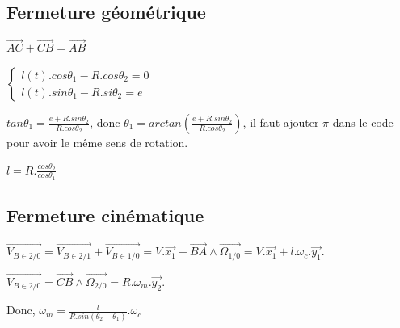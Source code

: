 \subsection{Fermeture géométrique}

$\overrightarrow{AC}+\overrightarrow{CB}=\overrightarrow{AB}$

$\left\{\begin{array}{l}
l(t).cos\theta_1-R.cos\theta_2=0\\
l(t).sin\theta_1-R.si\theta_2=e
\end{array}\right.$

$tan\theta_1=\frac{e+R.sin\theta_2}{R.cos\theta_2}$, donc $\theta_1=arctan\left(\frac{e+R.sin\theta_2}{R.cos\theta_2}\right)$, il faut ajouter $\pi$ dans le code pour avoir le même sens de rotation.

$l=R.\frac{cos\theta_2}{cos\theta_1}$

\subsection{Fermeture cinématique}

$\overrightarrow{V_{B\in 2/0}}=\overrightarrow{V_{B\in 2/1}}+\overrightarrow{V_{B\in 1/0}}=V.\overrightarrow{x_1}+\overrightarrow{BA}\wedge \overrightarrow{\Omega_{1/0}}=V.\overrightarrow{x_1}+l.\omega_c.\overrightarrow{y_1}$.

$\overrightarrow{V_{B\in 2/0}}=\overrightarrow{CB}\wedge \overrightarrow{\Omega_{2/0}}=R.\omega_m.\overrightarrow{y_2}$.

Donc, $\omega_m=\frac{l}{R.sin(\theta_2-\theta_1)}.\omega_c$

